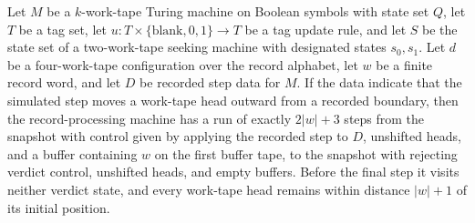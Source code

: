 \begin{theorem}
\label{Turing.recordStep_reject_run}
\leanok
{}
Let $M$ be a $k$-work-tape Turing machine on Boolean symbols with state set $Q$, let $T$
be a tag set, let $u:T\times\{\text{blank},0,1\}\to T$ be a tag update rule, and let $S$
be the state set of a two-work-tape seeking machine with designated states $s_0,s_1$.
Let $d$ be a four-work-tape configuration over the record alphabet, let $w$ be a finite
record word, and let $D$ be recorded step data for $M$. If the data indicate that the
simulated step moves a work-tape head outward from a recorded boundary, then the
record-processing machine has a run of exactly $2|w|+3$ steps from the snapshot with
control given by applying the recorded step to $D$, unshifted heads, and a buffer
containing $w$ on the first buffer tape, to the snapshot with rejecting verdict control,
unshifted heads, and empty buffers. Before the final step it visits neither verdict
state, and every work-tape head remains within distance $|w|+1$ of its initial position.
\end{theorem}

